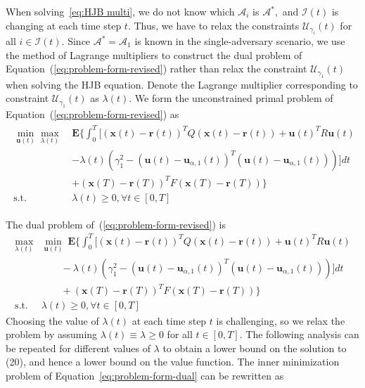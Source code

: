 \documentclass[journal]{IEEEtran}
\begin{document}
When solving~\eqref{eq:HJB multi}, we do not know which $\mathcal{A}_i$ is $\mathcal{A}^{\ast},$ and $\mathcal{I}(t)$ is changing at each time step $t.$ Thus, we have to relax the constraints $\mathcal{U}_{\gamma_i}(t)$ for all $i \in \mathcal{I}(t).$ Since $\mathcal{A}^{\ast} = \mathcal{A}_1$ is known in the single-adversary scenario, we use the method of Lagrange multipliers to construct the dual problem of Equation~(\ref{eq:problem-form-revised}) rather than relax the constraint $\mathcal{U}_{\gamma_1}(t)$ when solving the HJB equation. Denote the Lagrange multiplier corresponding to constraint $\mathcal{U}_{\gamma_1}(t)$ as $\lambda(t)$. 
We form the unconstrained primal problem of Equation~(\ref{eq:problem-form-revised}) as
\begin{align}
\label{eq:problem-form-primal}
\begin{split}
    \min_{\mathbf{u}(t)} \max_{\lambda(t)} \ & \mathbf{E}\{\int_{0}^{T}{[(\mathbf{x}(t)-\mathbf{r}(t))^{T}Q(\mathbf{x}(t)-\mathbf{r}(t)) }   + \mathbf{u}(t)^{T}R\mathbf{u}(t) \\
    &- \lambda(t)\left(\gamma_1^2 - \left(\mathbf{u}(t) - \mathbf{u}_{\alpha,1}(t)\right)^T\left(\mathbf{u}(t) - \mathbf{u}_{\alpha,1}(t)\right)\right) ]  dt \\
    &+(\mathbf{x}(T)-\mathbf{r}(T))^{T}F(\mathbf{x}(T)-\mathbf{r}(T)) \} \\
    \mbox{s.t.} \ &  \lambda(t) \geq 0, \forall t \in [0,T]
\end{split}
\end{align}


The dual problem of~(\ref{eq:problem-form-revised}) is~\cite{shapiro2005duality} 
\begin{subequations}\label{eq:problem-form-dual}
 \begin{align}
 \max_{\lambda(t)} &\min_{\mathbf{u}(t)} \ \mathbf{E}\{\int_{0}^{T}{[(\mathbf{x}(t)-\mathbf{r}(t))^{T}Q(\mathbf{x}(t)-\mathbf{r}(t)) }   + \mathbf{u}(t)^{T}R\mathbf{u}(t) \nonumber \\
 &\qquad- \lambda(t)\left(\gamma_1^2 - \left(\mathbf{u}(t) - \mathbf{u}_{\alpha,1}(t)\right)^T\left(\mathbf{u}(t) - \mathbf{u}_{\alpha,1}(t)\right)\right) ]  dt \nonumber \\
 & \qquad +(\mathbf{x}(T)-\mathbf{r}(T))^{T}F(\mathbf{x}(T)-\mathbf{r}(T)) \} \label{eq:problem-form-dual obj}\\
 \mbox{s.t.} \ &  \lambda(t) \geq 0, \forall t \in [0,T]
 \end{align}
 \end{subequations}
Choosing the value of $\lambda(t)$ at each time step $t$ is challenging, so we relax the problem by assuming $\lambda(t) \equiv \lambda \geq 0$ for all $t \in [0,T]$. The following analysis can be repeated for different values of $\lambda$ to obtain a lower bound on the solution to (20), and hence a lower bound on the value function. The inner minimization problem of Equation~\eqref{eq:problem-form-dual} can be rewritten as
\end{document}
